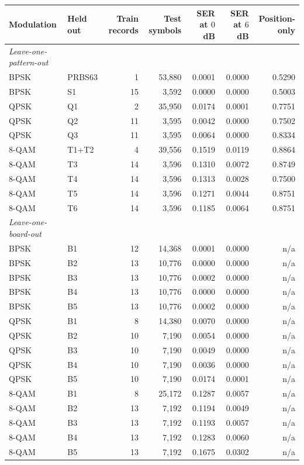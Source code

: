 \documentclass{ieeeaccess}
\begin{document}
\begin{table}[!t]
\label{tab:perfold}
\centering
\begin{tabular}{llrrrrr}
\toprule
Modulation & Held out & Train records & Test symbols
& SER at $0$~dB & SER at $6$~dB & Position-only \\
\midrule
\textit{Leave-one-pattern-out} & & & & & & \\
BPSK & PRBS63 & 1 & 53{,}880 & 0.0001 & 0.0000 & 0.5290 \\
BPSK & S1 & 15 & 3{,}592 & 0.0000 & 0.0000 & 0.5003 \\
QPSK & Q1 & 2 & 35{,}950 & 0.0174 & 0.0001 & 0.7751 \\
QPSK & Q2 & 11 & 3{,}595 & 0.0042 & 0.0000 & 0.7502 \\
QPSK & Q3 & 11 & 3{,}595 & 0.0064 & 0.0000 & 0.8334 \\
8-QAM & T1+T2 & 4 & 39{,}556 & 0.1519 & 0.0119 & 0.8864 \\
8-QAM & T3 & 14 & 3{,}596 & 0.1310 & 0.0072 & 0.8749 \\
8-QAM & T4 & 14 & 3{,}596 & 0.1313 & 0.0028 & 0.7500 \\
8-QAM & T5 & 14 & 3{,}596 & 0.1271 & 0.0044 & 0.8751 \\
8-QAM & T6 & 14 & 3{,}596 & 0.1185 & 0.0064 & 0.8751 \\
\addlinespace
\textit{Leave-one-board-out} & & & & & & \\
BPSK & B1 & 12 & 14{,}368 & 0.0001 & 0.0000 & n/a \\
BPSK & B2 & 13 & 10{,}776 & 0.0000 & 0.0000 & n/a \\
BPSK & B3 & 13 & 10{,}776 & 0.0002 & 0.0000 & n/a \\
BPSK & B4 & 13 & 10{,}776 & 0.0000 & 0.0000 & n/a \\
BPSK & B5 & 13 & 10{,}776 & 0.0002 & 0.0000 & n/a \\
QPSK & B1 & 8 & 14{,}380 & 0.0070 & 0.0000 & n/a \\
QPSK & B2 & 10 & 7{,}190 & 0.0054 & 0.0000 & n/a \\
QPSK & B3 & 10 & 7{,}190 & 0.0049 & 0.0000 & n/a \\
QPSK & B4 & 10 & 7{,}190 & 0.0036 & 0.0000 & n/a \\
QPSK & B5 & 10 & 7{,}190 & 0.0174 & 0.0001 & n/a \\
8-QAM & B1 & 8 & 25{,}172 & 0.1287 & 0.0057 & n/a \\
8-QAM & B2 & 13 & 7{,}192 & 0.1194 & 0.0049 & n/a \\
8-QAM & B3 & 13 & 7{,}192 & 0.1193 & 0.0057 & n/a \\
8-QAM & B4 & 13 & 7{,}192 & 0.1283 & 0.0060 & n/a \\
8-QAM & B5 & 13 & 7{,}192 & 0.1675 & 0.0302 & n/a \\
\bottomrule
\end{tabular}
\end{table}
\end{document}

